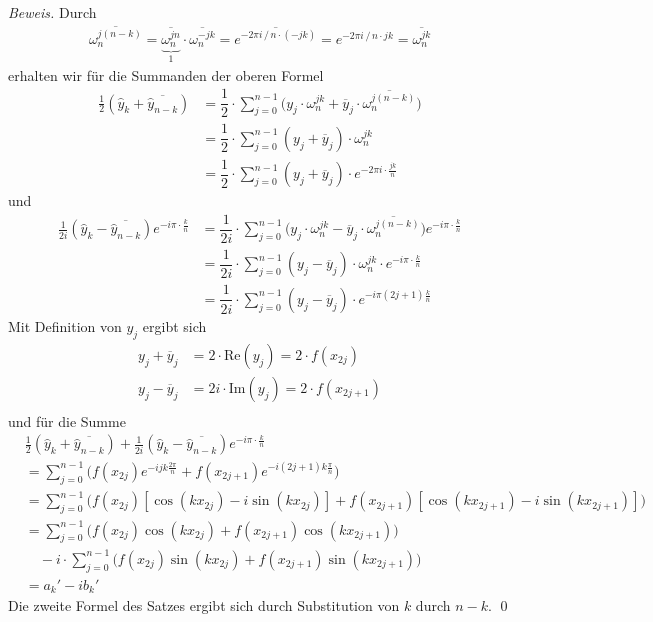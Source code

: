 \textit{Beweis.} 
Durch 
%
\begin{align*}
  \overline{\omega_n^{j(n-k)}} 
  = \overline{\underbrace{\omega_n^{jn}}_{1}} \cdot \overline{\omega_n^{-jk}} 
  = \overline{e^{-2\pi i \,/\,n\cdot(-jk)}}
  = e^{-2\pi i\,/\,n\cdot jk}
  = \overline{\omega_n^{jk}} 
\end{align*}
%
erhalten wir für die Summanden der oberen Formel
%
\begin{align*}
  \tfrac{1}{2}(\hat{y}_k + \overline{\hat{y}_{n-k}}) 
  &= \dfrac{1}{2}\cdot\sum_{j=0}^{n-1}
  \Big({y}_j\cdot\omega_n^{jk} + \overline{{y}}_j\cdot\overline{\omega_n^{j(n-k)}}\Big) \\
  &= \dfrac{1}{2}\cdot\sum_{j=0}^{n-1}\left({y}_j+\overline{{y}}_j\right)\cdot\omega_n^{jk}\\
  &= \dfrac{1}{2}\cdot\sum_{j=0}^{n-1}\left({y}_j+\overline{{y}}_j\right)\cdot e^{-2\pi i\cdot\frac{jk}{n}}
\end{align*}
%
und 
%
\begin{align*}
  \tfrac{1}{2i}(\hat{y}_k - \overline{\hat{y}_{n-k}})e^{-i\pi\cdot\tfrac{k}{n}}
  &= \dfrac{1}{2i}\cdot\sum_{j=0}^{n-1}
  \Big({y}_j\cdot\omega_n^{jk} - \overline{{y}}_j\cdot\overline{\omega_n^{j(n-k)}}\Big)
  e^{-i\pi\cdot\tfrac{k}{n}} \\
  &= \dfrac{1}{2i}\cdot\sum_{j=0}^{n-1}
  \left({y}_j-\overline{{y}}_j\right)\cdot\omega_n^{jk}\cdot e^{-i\pi\cdot\tfrac{k}{n}}\\
  &= \dfrac{1}{2i}\cdot\sum_{j=0}^{n-1}
  \left({y}_j-\overline{{y}}_j\right)\cdot e^{-i\pi(2j+1)\tfrac{k}{n}}
\end{align*}
%
Mit Definition von $y_j$ ergibt sich 
%
\begin{align*}
  {y}_j+\overline{{y}}_j &= 2\cdot \mathrm{Re}(y_j) = 2\cdot f(x_{2j}) \\
  {y}_j-\overline{{y}}_j &= 2i\cdot \mathrm{Im}(y_j) = 2\cdot f(x_{2j+1}) \\
\end{align*}
%
und für die Summe
%
\begin{align*}
  &\tfrac{1}{2}(\hat{y}_k + \overline{\hat{y}_{n-k}}) 
  +\tfrac{1}{2i}(\hat{y}_k - \overline{\hat{y}_{n-k}}) e^{-i\pi\cdot\tfrac{k}{n}} \\
  &= \sum_{j=0}^{n-1}\Big(f(x_{2j})e^{-ijk\tfrac{2\pi}{n}}+f(x_{2j+1})e^{-i(2j+1)k\tfrac{\pi}{n}}\Big) \\
  &= \sum_{j=0}^{n-1}\Big(f(x_{2j})\left[\cos(kx_{2j})-i\sin(kx_{2j})\right]
  + f(x_{2j+1})\left[\cos(kx_{2j+1})-i\sin(kx_{2j+1})\right]\Big) \\
  &= \sum_{j=0}^{n-1}\Big(f(x_{2j})\cos(kx_{2j}) + f(x_{2j+1})\cos(kx_{2j+1})\Big)\\
  &\quad - i\cdot\sum_{j=0}^{n-1}\Big(f(x_{2j})\sin(kx_{2j}) + f(x_{2j+1})\sin(kx_{2j+1})\Big) \\
  &= a_k' - ib_k'
\end{align*}
Die zweite Formel des Satzes ergibt sich durch Substitution von $k$ durch $n-k$. 
\qed

